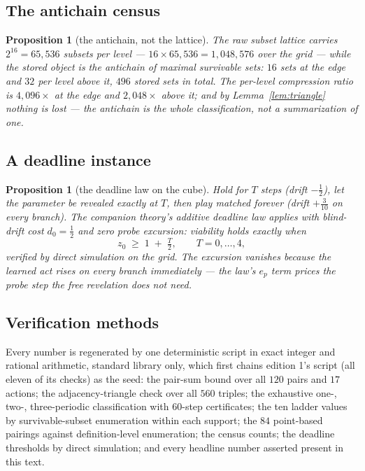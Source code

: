\documentclass[10pt,twocolumn]{article}
\theoremstyle{plain}
\newtheorem{proposition}[theorem]{Proposition}
\theoremstyle{definition}
\theoremstyle{remark}
\begin{document}
\subsection{The antichain census}\label{census}

\begin{proposition}[the antichain, not the lattice]\label{prop:census}
The raw subset lattice carries \(2^{16} = 65{,}536\) subsets per
level --- \(16 \times 65{,}536 = 1{,}048{,}576\) over the grid ---
while the stored object is the antichain of maximal survivable sets:
\(16\) sets at the edge and \(32\) per level above it, \(496\) stored
sets in total. The per-level compression ratio is \(4{,}096\times\) at
the edge and \(2{,}048\times\) above it; and by
Lemma~\ref{lem:triangle} nothing is lost --- the antichain is the
whole classification, not a summarization of one.
\end{proposition}

\subsection{A deadline instance}\label{deadline}

\begin{proposition}[the deadline law on the cube]\label{prop:deadline}
Hold for \(T\) steps (drift \(-\tfrac12\)), let the parameter be
revealed exactly at \(T\), then play matched forever (drift
\(+\tfrac3{10}\) on every branch). The companion theory's additive
deadline law applies with blind-drift cost \(d_{0} = \tfrac12\) and
zero probe excursion: viability holds exactly when
\[
z_{0} \;\ge\; 1 \;+\; \tfrac{T}{2}, \qquad T = 0, \dots, 4,
\]
verified by direct simulation on the grid. The excursion vanishes
because the learned act rises on every branch immediately --- the
law's \(e_{p}\) term prices the probe step the free revelation does
not need.
\end{proposition}

\subsection{Verification methods}\label{methods}

Every number is regenerated by one deterministic script in exact
integer and rational arithmetic, standard library only, which first
chains edition 1's script (all eleven of its checks) as the seed: the
pair-sum bound over all \(120\) pairs and \(17\) actions; the
adjacency-triangle check over all \(560\) triples; the exhaustive
one-, two-, three-periodic classification with \(60\)-step
certificates; the ten ladder values by survivable-subset enumeration
within each support; the \(84\) point-based pairings against
definition-level enumeration; the census counts; the deadline
thresholds by direct simulation; and every headline number asserted
present in this text.
\end{document}
